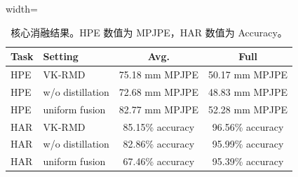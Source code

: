 \begin{table}[H]
\centering
\caption{核心消融结果。HPE 数值为 MPJPE，HAR 数值为 Accuracy。}
\label{tab:ablation_cn}
\scriptsize
\begin{adjustbox}{width=\linewidth}
\begin{tabular}{llcc}
\toprule
Task & Setting & Avg. & Full \\
\midrule
HPE & VK-RMD & 75.18 mm MPJPE & 50.17 mm MPJPE \\
HPE & w/o distillation & 72.68 mm MPJPE & 48.83 mm MPJPE \\
HPE & uniform fusion & 82.77 mm MPJPE & 52.28 mm MPJPE \\
HAR & VK-RMD & 85.15\% accuracy & 96.56\% accuracy \\
HAR & w/o distillation & 82.86\% accuracy & 95.99\% accuracy \\
HAR & uniform fusion & 67.46\% accuracy & 95.39\% accuracy \\
\bottomrule
\end{tabular}
\end{adjustbox}
\end{table}
